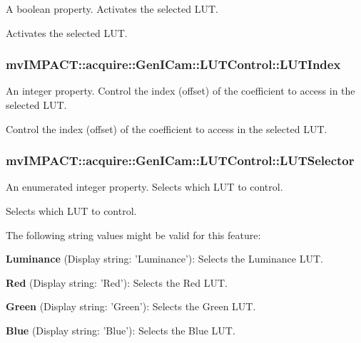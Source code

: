 A boolean property. Activates the selected L\+U\+T. 

Activates the selected L\+U\+T. \hypertarget{classmv_i_m_p_a_c_t_1_1acquire_1_1_gen_i_cam_1_1_l_u_t_control_a884671c2be5384d266a2f8f0bb3ff2d3}{
\subsubsection[{L\+U\+T\+Index}]{ mv\+I\+M\+P\+A\+C\+T\+::acquire\+::\+Gen\+I\+Cam\+::\+L\+U\+T\+Control\+::\+L\+U\+T\+Index}}\label{classmv_i_m_p_a_c_t_1_1acquire_1_1_gen_i_cam_1_1_l_u_t_control_a884671c2be5384d266a2f8f0bb3ff2d3}


An integer property. Control the index (offset) of the coefficient to access in the selected L\+U\+T. 

Control the index (offset) of the coefficient to access in the selected L\+U\+T. \hypertarget{classmv_i_m_p_a_c_t_1_1acquire_1_1_gen_i_cam_1_1_l_u_t_control_a7be4476d2a3e5d5b9f54976500ec72e9}{
\subsubsection[{L\+U\+T\+Selector}]{ mv\+I\+M\+P\+A\+C\+T\+::acquire\+::\+Gen\+I\+Cam\+::\+L\+U\+T\+Control\+::\+L\+U\+T\+Selector}}\label{classmv_i_m_p_a_c_t_1_1acquire_1_1_gen_i_cam_1_1_l_u_t_control_a7be4476d2a3e5d5b9f54976500ec72e9}


An enumerated integer property. Selects which L\+U\+T to control. 

Selects which L\+U\+T to control.

The following string values might be valid for this feature\+:
\begin{DoxyItemize}
\item {\bfseries Luminance} (Display string\+: 'Luminance')\+: Selects the Luminance L\+U\+T.
\item {\bfseries Red} (Display string\+: 'Red')\+: Selects the Red L\+U\+T.
\item {\bfseries Green} (Display string\+: 'Green')\+: Selects the Green L\+U\+T.
\item {\bfseries Blue} (Display string\+: 'Blue')\+: Selects the Blue L\+U\+T.
\end{DoxyItemize}

